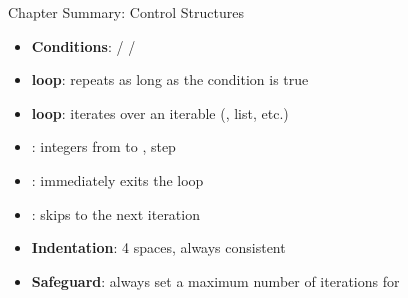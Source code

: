 \begin{keyformulas}{Chapter Summary: Control Structures}
\begin{itemize}
    \item \textbf{Conditions}:  /  / 
    \item \textbf{ loop}: repeats as long as the condition is true
    \item \textbf{ loop}: iterates over an iterable (, list, etc.)
    \item \textbf{}: integers from  to , step 
    \item \textbf{}: immediately exits the loop
    \item \textbf{}: skips to the next iteration
    \item \textbf{Indentation}: 4 spaces, always consistent
    \item \textbf{Safeguard}: always set a maximum number of iterations for 
\end{itemize}
\end{keyformulas}
